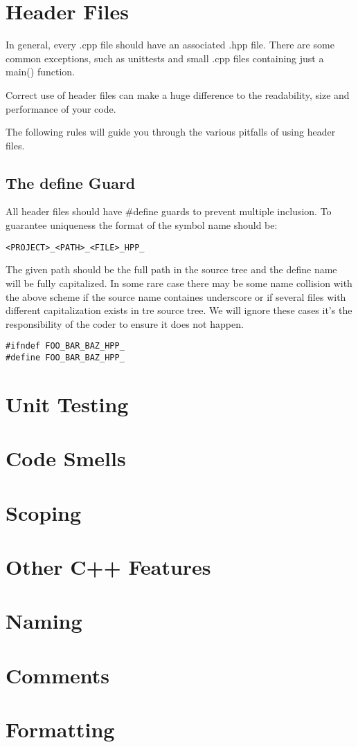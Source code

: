 \documentclass[11pt]{report}
\begin{document}
\chapter{Header Files}

In general, every .cpp file should have an associated .hpp file. There are some common exceptions, such as unittests and small .cpp files containing just a main() function.

Correct use of header files can make a huge difference to the readability, size and performance of your code.

The following rules will guide you through the various pitfalls of using header files. 

\section{The define Guard}

All header files should have \#define guards to prevent multiple inclusion. To guarantee uniqueness the format of the symbol name should be:
\vspace{5pt}
\begin{lstlisting}[frame=none]
<PROJECT>_<PATH>_<FILE>_HPP_
\end{lstlisting}
\vspace{-20pt}
 \lstinline{}

The given path should be the full path in the source tree and the define name will be fully capitalized. In some rare case there may be some name collision with the above scheme if the source name containes underscore or if several files with different capitalization exists in tre source tree. We will ignore these cases it's the responsibility of the coder to ensure it does not happen.

\vspace{5pt}
\begin{lstlisting}
#ifndef FOO_BAR_BAZ_HPP_
#define FOO_BAR_BAZ_HPP_
\end{lstlisting}
\vspace{-20pt}

\chapter{Unit Testing}

\chapter{Code Smells}

\chapter{Scoping}

\chapter{Other C++ Features}

\chapter{Naming}

\chapter{Comments}

\chapter{Formatting}
\end{document}
